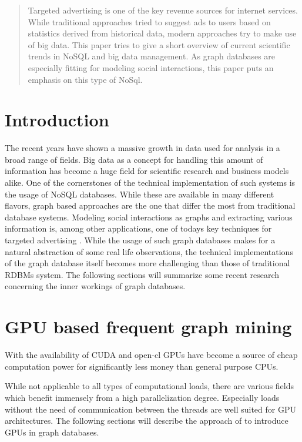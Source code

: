 \documentclass{sig-alternate}
\begin{document}
\maketitle
\begin{abstract}
Targeted advertising is one of the key revenue sources 
for internet services. While traditional approaches tried
to suggest ads to users based on statistics derived from historical data,
modern approaches try to make use of big data.
This paper tries to give a short overview of current scientific trends 
in NoSQL and big data management. As graph databases are especially fitting for 
modeling social interactions, this paper puts an emphasis on this type of NoSql.
\end{abstract}


\section{Introduction}
The recent years have shown a massive growth in data 
used for analysis in a broad range of fields.
Big data as a concept for handling this amount of information
has become a huge field for scientific research and 
business models alike. One of the cornerstones of the technical
implementation of such systems is the usage of NoSQL databases.
While these are available in many different flavors, graph based approaches
are the one that differ the most from traditional database systems.
Modeling social interactions as graphs and extracting various information
is, among other applications, one of todays key techniques for targeted advertising \cite{dia2006mining}.
While the usage of such graph databases makes for a natural abstraction
of some real life observations, the technical implementations
of the graph database itself becomes more challenging than those of
traditional RDBMs system.
The following sections will summarize some recent research concerning 
the inner workings of graph databases.

\section{GPU based frequent graph mining}
With the availability of CUDA and open-cl GPUs have become
a source of cheap computation power for significantly less money 
than general purpose CPUs. 

While not applicable to all types
of computational loads, there are various fields which benefit 
immensely from a high parallelization degree.
Especially loads without the need of communication between the 
threads are well suited for GPU architectures.
The following sections will describe the approach of \cite{kessl2014parallel}
to introduce GPUs in graph databases.
\end{document}
